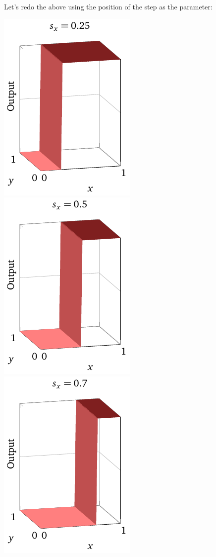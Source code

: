 \documentclass[a4paper,twoside,10pt]{book}
\begin{document}
Let's redo the above using the position of the step as the parameter:
\begin{center}
	\includegraphics[width=0.32\linewidth]{./figures/ch4/3d/stepx1}
	\includegraphics[width=0.32\linewidth]{./figures/ch4/3d/stepx2}
	\includegraphics[width=0.32\linewidth]{./figures/ch4/3d/stepx3}

\end{center}
\end{document}
